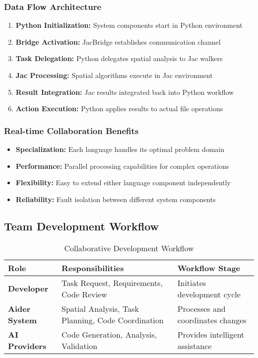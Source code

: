 \documentclass[12pt,a4paper]{article}
\begin{document}
\subsubsection{Data Flow Architecture}
\begin{enumerate}
    \item \textbf{Python Initialization:} System components start in Python environment
    \item \textbf{Bridge Activation:} JacBridge establishes communication channel
    \item \textbf{Task Delegation:} Python delegates spatial analysis to Jac walkers
    \item \textbf{Jac Processing:} Spatial algorithms execute in Jac environment
    \item \textbf{Result Integration:} Jac results integrated back into Python workflow
    \item \textbf{Action Execution:} Python applies results to actual file operations
\end{enumerate}

\subsubsection{Real-time Collaboration Benefits}
\begin{itemize}
    \item \textbf{Specialization:} Each language handles its optimal problem domain
    \item \textbf{Performance:} Parallel processing capabilities for complex operations
    \item \textbf{Flexibility:} Easy to extend either language component independently
    \item \textbf{Reliability:} Fault isolation between different system components
\end{itemize}

\subsection{Team Development Workflow}

\begin{table}[H]
\centering
\caption{Collaborative Development Workflow}
\begin{tabularx}{\textwidth}{|l|X|X|}
\hline
\textbf{Role} & \textbf{Responsibilities} & \textbf{Workflow Stage} \\
\hline
\textbf{Developer} & Task Request, Requirements, Code Review & Initiates development cycle \\
\hline
\textbf{Aider System} & Spatial Analysis, Task Planning, Code Coordination & Processes and coordinates changes \\
\hline
\textbf{AI Providers} & Code Generation, Analysis, Validation & Provides intelligent assistance \\
\hline
\end{tabularx}
\label{fig:workflow}
\end{table}
\end{document}
